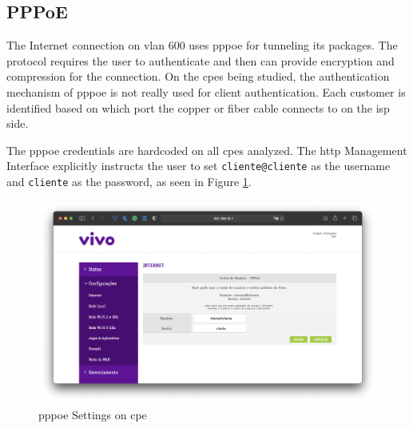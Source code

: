 \subsection{PPPoE}

The Internet connection on \gls{vlan} 600 uses \gls{pppoe} \cite{rfc2516} for tunneling its packages. The protocol requires the user to authenticate and then can provide encryption and compression for the connection. On the \glspl{cpe} being studied, the authentication mechanism of \gls{pppoe} is not really used for client authentication. Each customer is identified based on which port the copper or fiber cable connects to on the \gls{isp} side.

The \gls{pppoe} credentials are hardcoded on all \glspl{cpe} analyzed. The \gls{http} Management Interface explicitly instructs the user to set \texttt{cliente@cliente} as the username and \texttt{cliente} as the password, as seen in Figure \ref{figure:cpe_pppoe}.

\begin{figure}[h]
    \centering
    \includegraphics[width=\linewidth]{contents/configuration-analysis/pppoe/cpe-pppoe.png}
    \caption{\gls{pppoe} Settings on \gls{cpe}}
    \label{figure:cpe_pppoe}
\end{figure}

\FloatBarrier
